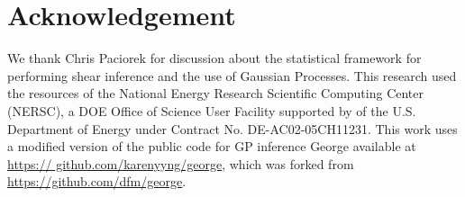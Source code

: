 

\section{Acknowledgement}
We thank Chris Paciorek for discussion about the statistical
framework for performing shear inference and the
use of Gaussian Processes.
This research
used the resources of the National Energy Research Scientific 
Computing Center (NERSC), a DOE Office of Science
User Facility supported by 
of the U.S. Department of Energy under Contract No.
DE-AC02-05CH11231.
 This work uses a modified version
of the public code for GP inference {\sc George} available at \href{https://
github.com/karenyyng/george}{https://
github.com/karenyyng/george}, which was forked from \\
\href{https://github.com/dfm/george}{https://github.com/dfm/george}.



